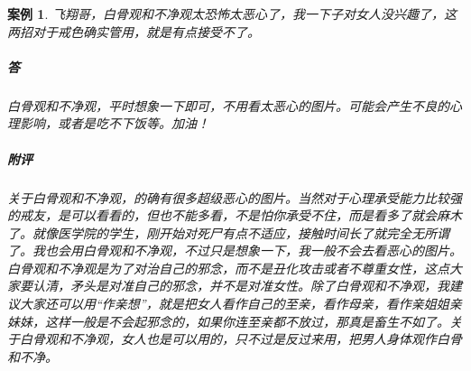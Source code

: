 \documentclass[fontset=founder]{ctexart}
\newtheorem{case}{案例}
\begin{document}
\begin{case}
    飞翔哥，白骨观和不净观太恐怖太恶心了，我一下子对女人没兴趣了，这两招对于戒色确实管用，就是有点接受不了。
    \subparagraph{答} 白骨观和不净观，平时想象一下即可，不用看太恶心的图片。可能会产生不良的心理影响，或者是吃不下饭等。加油！
    \subparagraph{附评} 关于白骨观和不净观，的确有很多超级恶心的图片。当然对于心理承受能力比较强的戒友，是可以看看的，但也不能多看，不是怕你承受不住，而是看多了就会麻木了。就像医学院的学生，刚开始对死尸有点不适应，接触时间长了就完全无所谓了。我也会用白骨观和不净观，不过只是想象一下，我一般不会去看恶心的图片。白骨观和不净观是为了对治自己的邪念，而不是丑化攻击或者不尊重女性，这点大家要认清，矛头是对准自己的邪念，并不是对准女性。除了白骨观和不净观，我建议大家还可以用“作亲想”，就是把女人看作自己的至亲，看作母亲，看作亲姐姐亲妹妹，这样一般是不会起邪念的，如果你连至亲都不放过，那真是畜生不如了。关于白骨观和不净观，女人也是可以用的，只不过是反过来用，把男人身体观作白骨和不净。
\end{case}
\end{document}
